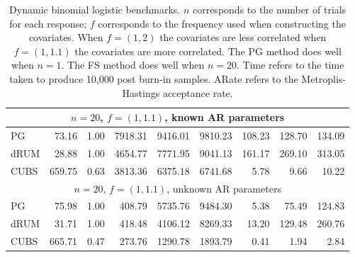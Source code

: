 \documentclass[12pt]{article}
\begin{document}
\begin{table}
\begin{tabular}{l r r r r r r r r }
\hline
\multicolumn{9}{c}{$n=20$, $f = (1,1.1)$, known AR parameters} \\
\hline
             PG   &    73.16 &     1.00 &   7918.31 &   9416.01 &   9810.23 &    108.23 &    128.70 &    134.09 \\ 
           dRUM   &    28.88 &     1.00 &   4654.77 &   7771.95 &   9041.13 &    161.17 &    269.10 &    313.05 \\ 
           CUBS   &   659.75 &     0.63 &   3813.36 &   6375.18 &   6741.68 &      5.78 &      9.66 &     10.22
 \\ %

\hline
\multicolumn{9}{c}{$n=20$, $f = (1,1.1)$, unknown AR parameters} \\
\hline
             PG   &    75.98 &     1.00 &    408.79 &   5735.76 &   9484.30 &      5.38 &     75.49 &    124.83 \\ 
           dRUM   &    31.71 &     1.00 &    418.48 &   4106.12 &   8269.33 &     13.20 &    129.48 &    260.76 \\ 
           CUBS   &   665.71 &     0.47 &    273.76 &   1290.78 &   1893.79 &      0.41 &      1.94 &      2.84
 \end{tabular}

 \caption{\label{tab:dynlogit-detail} Dynamic binomial logistic benchmarks.  $n$
   corresponds to the number of trials for each response; $f$ corresponds to the
   frequency used when constructing the covariates.  When $f = (1,2)$ the
   covariates are less correlated when $f=(1,1.1)$ the covariates are more
   correlated.  The PG method does well when $n=1$.  The FS method does well
   when $n=20$.  Time refers to the time taken to produce 10,000 post burn-in
   samples.  ARate refers to the Metroplis-Hastings acceptance rate.}
\end{table}

\end{document}
